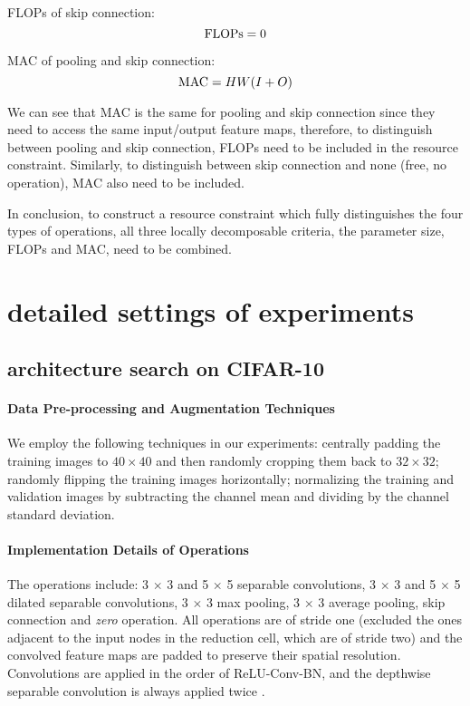 \documentclass{article} \usepackage{iclr2019_conference,times}
\begin{document}
FLOPs of skip connection:
\begin{equation}
	{\rm FLOPs} = 0
\end{equation}

MAC of pooling and skip connection:
\begin{equation}
	{\rm MAC} = HW(I + O) 
\end{equation}

We can see that MAC is the same for pooling and skip connection since they need to access the same input/output feature maps, therefore, to distinguish between pooling and skip connection, FLOPs need to be included in the resource constraint. Similarly, to distinguish between skip connection and none (free, no operation), MAC also need to be included.

In conclusion, to construct a resource constraint which fully distinguishes the four types of operations, all three locally decomposable criteria, the parameter size, FLOPs and MAC, need to be combined.

\section{detailed settings of experiments}

\subsection{architecture search on CIFAR-10}

\paragraph{Data Pre-processing and Augmentation Techniques}

We employ the following techniques in our experiments: centrally padding the training images to $40\times 40$ and then randomly cropping them back to $32\times 32$; randomly flipping the training images horizontally; normalizing the training and validation images by subtracting the channel mean and dividing by the channel standard deviation.

\paragraph{Implementation Details of Operations}

The operations include: 3 $\times$ 3 and 5 $\times$ 5 separable convolutions, 3 $\times$ 3 and 5 $\times$ 5 dilated separable convolutions, 3 $\times$ 3 max pooling, 3 $\times$ 3 average pooling, skip connection and \textit{zero} operation. All operations are of stride one (excluded the ones adjacent to the input nodes in the reduction cell, which are of stride two) and the convolved feature maps are padded to preserve their spatial resolution. Convolutions are applied in the order of ReLU-Conv-BN, and the depthwise separable convolution is always applied twice \citep{zoph2017learning, real2018regularized, liu2017progressive, liu2018darts}.
\end{document}
